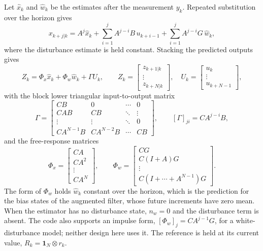Let $\hat x_k$ and $\hat w_k$ be the estimates after the measurement $y_k$.
Repeated substitution over the horizon gives
\begin{equation}
 x_{k+j|k}=A^j\hat x_k
 +\sum_{i=1}^{j}A^{j-i}B\,u_{k+i-1}
 +\sum_{i=1}^{j}A^{j-i}G\,\hat w_k,
 \label{eq:p8-rollout}
\end{equation}
where the disturbance estimate is held constant. Stacking the predicted outputs
gives
\begin{equation}
 Z_k=\Phi_x\hat x_k+\Phi_w\hat w_k+\Gamma U_k,
 \qquad
 Z_k=\begin{bmatrix}z_{k+1|k}\\ \vdots\\ z_{k+N|k}\end{bmatrix},
 \quad
 U_k=\begin{bmatrix}u_k\\ \vdots\\ u_{k+N-1}\end{bmatrix},
 \label{eq:p8-prediction}
\end{equation}
with the block lower triangular input-to-output matrix
\begin{equation}
 \Gamma=
 \begin{bmatrix}
  CB & 0 & \cdots & 0\\
  CAB & CB & \ddots & \vdots\\
  \vdots & \vdots & \ddots & 0\\
  CA^{N-1}B & CA^{N-2}B & \cdots & CB
 \end{bmatrix},
 \qquad
 [\Gamma]_{ji}=CA^{j-i}B,
 \label{eq:p8-gamma}
\end{equation}
and the free-response matrices
\begin{equation}
 \Phi_x=\begin{bmatrix}CA\\ CA^2\\ \vdots\\ CA^N\end{bmatrix},
 \qquad
 \Phi_w=
 \begin{bmatrix}CG\\ C(I+A)G\\ \vdots\\ C(I+\cdots+A^{N-1})G\end{bmatrix}.
 \label{eq:p8-phix-phiw}
\end{equation}
The form of $\Phi_w$ holds $\hat w_k$ constant over the horizon, which is the
prediction for the bias states of the augmented filter, whose future increments
have zero mean. When the estimator has no disturbance state, $n_w=0$ and the
disturbance term is absent. The code also supports an impulse form,
$[\Phi_w]_j=CA^{j-1}G$, for a white-disturbance model; neither design here
uses it. The reference is held at its current value,
$R_k=\mathbf{1}_N\otimes r_k$.

